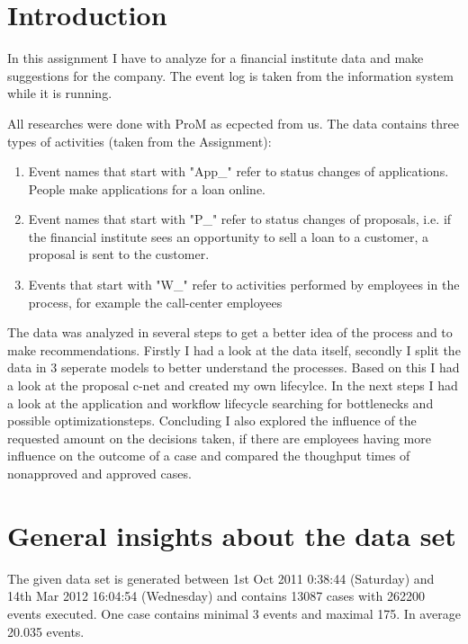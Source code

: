 \section{Introduction}
In this assignment I have to analyze for a financial institute data and make suggestions for the company. The event log is taken from the information system while it is running. 

All researches were done with ProM as ecpected from us. The data contains three types of activities (taken from the Assignment):

\begin{enumerate}
	\item Event names that start with "App\_" refer to status changes of applications. People make applications for a loan online.
	\item Event names that start with "P\_" refer to status changes of proposals, i.e. if the financial institute sees an opportunity to sell a loan to a customer, a proposal is sent to the customer.
	\item Events that start with "W\_" refer to activities performed by employees in the process, for example the call-center employees
\end{enumerate}

The data was analyzed in several steps to get a better idea of the process and to make recommendations. Firstly I had a look at the data itself, secondly I split the data in 3 seperate models to better understand the processes. Based on this I had a look at the proposal c-net and created my own lifecylce. In the next steps I had a look at the application and workflow lifecycle searching for bottlenecks and possible optimizationsteps.
Concluding I also explored the influence of the requested amount on the decisions taken, if there are employees having more influence on the outcome of a case and compared the thoughput times of nonapproved and approved cases.

\section{General insights about the data set}

The given data set is generated between 1st Oct 2011 0:38:44 (Saturday) and 14th Mar 2012 16:04:54 (Wednesday) and contains 13087 cases with 262200 events executed. One case contains minimal 3 events and maximal 175. In average 20.035 events.

